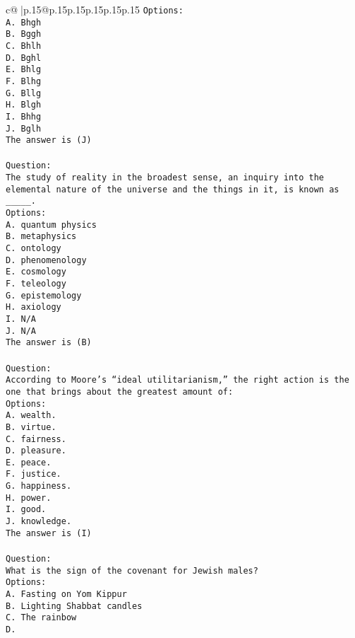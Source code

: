 \documentclass{article}
\begin{document}
{\begin{supertabular}{c@{$\;$}|p{.15\linewidth}@{}p{.15\linewidth}p{.15\linewidth}p{.15\linewidth}p{.15\linewidth}p{.15\linewidth}}
{{{\tt Options:\\ \tt A. Bhgh\\ \tt B. Bggh\\ \tt C. Bhlh\\ \tt D. Bghl\\ \tt E. Bhlg\\ \tt F. Blhg\\ \tt G. Bllg\\ \tt H. Blgh\\ \tt I. Bhhg\\ \tt J. Bglh\\ \tt The answer is (J)\\ \tt \\ \tt Question:\\ \tt The study of reality in the broadest sense, an inquiry into the elemental nature of the universe and the things in it, is known as _____.\\ \tt Options:\\ \tt A. quantum physics\\ \tt B. metaphysics\\ \tt C. ontology\\ \tt D. phenomenology\\ \tt E. cosmology\\ \tt F. teleology\\ \tt G. epistemology\\ \tt H. axiology\\ \tt I. N/A\\ \tt J. N/A\\ \tt The answer is (B)\\ \tt \\ \tt Question:\\ \tt According to Moore’s “ideal utilitarianism,” the right action is the one that brings about the greatest amount of:\\ \tt Options:\\ \tt A. wealth.\\ \tt B. virtue.\\ \tt C. fairness.\\ \tt D. pleasure.\\ \tt E. peace.\\ \tt F. justice.\\ \tt G. happiness.\\ \tt H. power.\\ \tt I. good.\\ \tt J. knowledge.\\ \tt The answer is (I)\\ \tt \\ \tt Question:\\ \tt What is the sign of the covenant for Jewish males?\\ \tt Options:\\ \tt A. Fasting on Yom Kippur\\ \tt B. Lighting Shabbat candles\\ \tt C. The rainbow\\ \tt D. }}}
\end{supertabular}}
\end{document}
